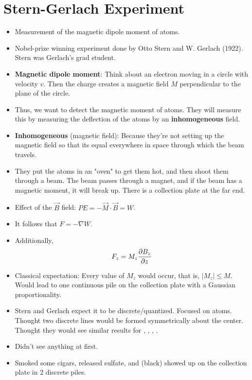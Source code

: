 \documentclass[../notes.tex]{subfiles}
\begin{document}
\section{Stern-Gerlach Experiment}
\begin{itemize}
    \item {}Measurement of the magnetic dipole moment of atoms.
    \item Nobel-prize winning experiment done by Otto Stern and W. Gerlach (1922). Stern was Gerlach's grad student.
    \item \textbf{Magnetic dipole moment}: Think about an electron moving in a circle with velocity $v$. Then the charge creates a magnetic field $M$ perpendicular to the plane of the circle.
    \item Thus, we want to detect the magnetic moment of atoms. They will measure this by measuring the deflection of the atoms by an \textbf{inhomogeneous} field.
    \item \textbf{Inhomogeneous} (magnetic field): Because they're not setting up the magnetic field so that its equal everywhere in space through which the beam travels.
    \item They put the atoms in an "oven" to get them hot, and then shoot them through a beam. The beam passes through a magnet, and if the beam has a magnetic moment, it will break up. There is a collection plate at the far end.
    \item Effect of the $\vec{B}$ field: $PE=-\vec{M}\cdot\vec{B}=W$.
    \item It follows that $F=-\nabla W$.
    \item Additionally,
    \begin{equation*}
        F_z = M_z\pdv{B_z}{z}
    \end{equation*}
    \item Classical expectation: Every value of $M_z$ would occur, that is, $|M_z|\leq M$. Would lead to one continuous pile on the collection plate with a Gaussian proportionality.
    \item Stern and Gerlach expect it to be discrete/quantized. Focused on  atoms. Thought two discrete lines would be formed symmetrically about the center. Thought they would see similar results for , , , .
    \item Didn't see anything at first.
    \item Smoked some cigars, released sulfate, and  (black) showed up on the collection plate in 2 discrete piles.

\end{itemize}
\end{document}

